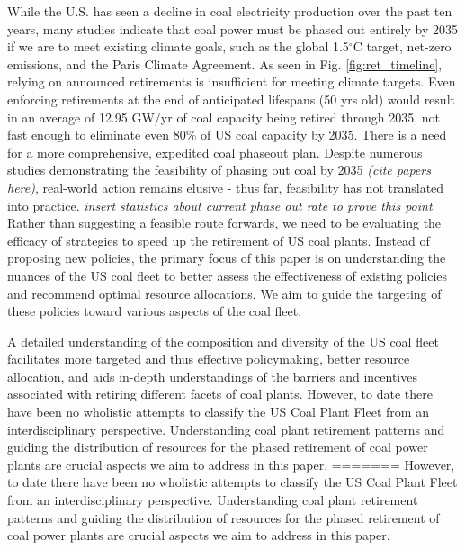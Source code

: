 While the U.S. has seen a decline in coal electricity production over the past ten years, many studies indicate that coal power must be phased out entirely by 2035 if we are to meet existing climate goals, such as the global 1.5$^\circ$C target, 
net-zero emissions, 
and the Paris Climate Agreement. As seen in Fig. \ref{fig:ret_timeline}, relying on announced retirements is insufficient for meeting climate targets.
Even enforcing retirements at the end of anticipated lifespans (50 yrs old) would result in an average of 12.95 GW/yr of coal capacity being retired through 2035,
not fast enough to eliminate even 80\% of US coal capacity by 2035.
There is a need for a more comprehensive, expedited coal phaseout plan.
Despite numerous studies demonstrating the feasibility of phasing out coal by 2035 \textit{(cite papers here)}, 
real-world action remains elusive - thus far, feasibility has not translated into practice. \textit{insert statistics about current phase out rate to prove this point} 
Rather than suggesting a feasible route forwards, we need to be evaluating the efficacy of strategies to speed up the retirement of US coal plants. 
Instead of proposing new policies, the primary focus of this paper is on understanding the nuances of the US coal fleet to better assess the effectiveness 
of existing policies and recommend optimal resource allocations. We aim to guide the targeting of these policies toward various aspects of the coal fleet.


A detailed understanding of the composition and
diversity of the US coal fleet facilitates more targeted and thus effective policymaking, better resource allocation, and aids in-depth
understandings of the barriers and incentives associated with retiring different facets of coal plants. However, to date there have been no wholistic attempts to
classify the US Coal Plant Fleet from an interdisciplinary perspective. Understanding coal plant retirement patterns 
and guiding the distribution of resources for the phased retirement of coal power plants are crucial aspects we aim to address in this paper.
=======
However, to date there have been no wholistic attempts to
classify the US Coal Plant Fleet from an interdisciplinary perspective. Understanding coal plant retirement patterns 
and guiding the distribution of resources for the phased retirement of coal power plants are crucial aspects we aim to address in this paper.

